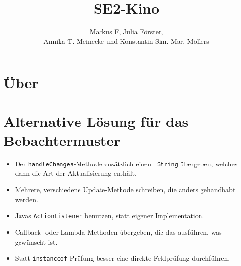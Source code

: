 \documentclass{scrartcl}
\title{SE2-Kino}
\author{
 Markus {\sc F},
 Julia {\sc F\"orster}, \\
 Annika T. {\sc Meinecke} und 
 Konstantin Sim. Mar. {\sc Möllers}
}
\begin{document}
 
\maketitle
\tableofcontents
\section{Über}

\section{Alternative Lösung für das Bebachtermuster}
\begin{itemize}
	\item Der {\tt handleChanges}-Methode zusätzlich einen {\tt 
String} übergeben, welches dann die Art der Aktualisierung enthält.
	\item Mehrere, verschiedene Update-Methode schreiben, die anders 
gehandhabt werden.
	\item Javas {\tt ActionListener} benutzen, statt eigener 
Implementation.
	\item Callback- oder Lambda-Methoden übergeben, die das 
ausführen, was gewünscht ist.
	\item Statt {\tt instanceof}-Prüfung besser eine direkte 
Feldprüfung durchführen.
\end{itemize}
\end{document}
